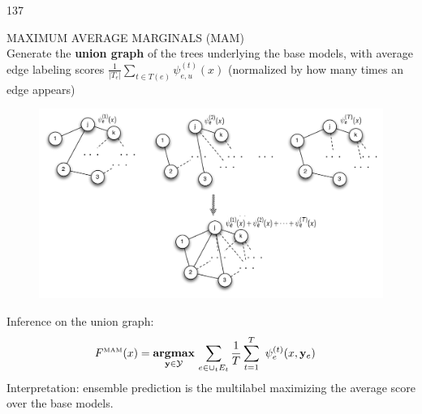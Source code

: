 \documentclass[a4poster]{article}
\newcommand{\Ycal}{\mathcal{Y}}
\newcommand{\yb}{\mathbf{y}}
\newcommand{\argmax}{\textbf{argmax}}
\begin{document}
\begin{textblock}{137}
\begin{multicols}{2}
	\vspace{0.1cm}
	\normalsize{\color{sciorange} MAXIMUM AVERAGE MARGINALS (MAM)}\\
	\footnotesize
	Generate the {\bf union graph} of the trees underlying the base models, with average edge labeling scores $\frac{1}{|T_e|} \sum_{t  \in T(e) } \psi^{(t)}_{e,u}(x)$ (normalized by how many times an edge appears)
	\begin{figure}[t]
	\vspace{-2mm}
	\begin{center}
		\includegraphics[page={1},width=1 \columnwidth]{./ensemble_3.pdf}
	\label{ensemble_3}
	\end{center}
	\end{figure}
	\vspace{-5mm}
	Inference on the union graph:
		\begin{align*}
			F^{\text{\tiny MAM}}(x) &= \underset{\yb \in \Ycal }{\argmax}\,\sum_{e\in \cup_t E_t}\frac{1}{T}\sum_{t=1}^{T}\ \psi^{(t)}_e(x,\yb_e)
		\end{align*}			
	Interpretation: ensemble prediction is the multilabel maximizing the average score over the base models.
	


	\end{multicols}
\end{textblock}
\end{document}

